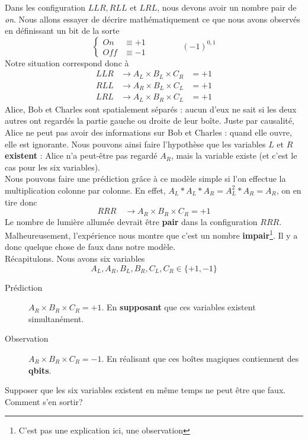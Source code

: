 Dans les configuration $LLR, RLL$ et $LRL$, nous devons avoir un nombre pair de \textit{on}. Nous
allons essayer de décrire mathématiquement ce que nous avons observés en définissant un bit de la
sorte
\begin{equation}
\left\{\begin{array}{ll}
On &\equiv +1\\
Off&\equiv -1
\end{array}\right.\qquad\qquad (-1)^{0,1}
\end{equation}
Notre situation correspond donc à
\begin{equation}
\begin{array}{lll}
LLR &\to A_L\times B_L\times C_R &=+1\\
RLL &\to A_R\times B_L\times C_L &=+1\\
LRL &\to A_L\times B_R\times C_L &=+1
\end{array}
\end{equation}
Alice, Bob et Charles sont spatialement séparés : aucun d'eux ne sait si les deux autres ont 
regardés la partie gauche ou droite de leur boîte. Juste par causalité, Alice ne peut pas 
avoir des informations sur Bob et Charles : quand elle ouvre, elle est ignorante. Nous pouvons
ainsi faire l'hypothèse que les variables $L$ et $R$ \textbf{existent} : Alice n'a peut-être
pas regardé $A_R$, mais la variable existe (et c'est le cas pour les six variables).\\

Nous pouvons faire une prédiction grâce à ce modèle simple si l'on effectue la multiplication
colonne par colonne. En effet, $A_L*A_L*A_R = A_L^2*A_R=A_R$, on en tire donc
\begin{equation}
RRR\quad\to A_R\times B_R\times C_R = +1
\end{equation}
Le nombre de lumière allumée devrait être \textbf{pair} dans la configuration $RRR$. Malheureusement,
l'expérience nous montre que c'est un nombre \textbf{impair}\footnote{C'est pas une explication ici,
une observation}. Il y a donc quelque chose de faux dans notre modèle.\\

Récapitulons. Nous avons six variables
\begin{equation}
A_L,A_R, B_L,B_R,C_L,C_R \in \{+1,-1\}
\end{equation}
\begin{description}
\item[Prédiction] $A_R\times B_R\times C_R = +1$. En \textbf{supposant} que ces variables 
existent simultanément. 
\item[Observation] $A_R\times B_R\times C_R = -1$. En réalisant que ces boîtes magiques
contiennent des \textbf{qbits}.
\end{description}
Supposer que les six variables existent en même temps ne peut être que faux. Comment s'en sortir?

